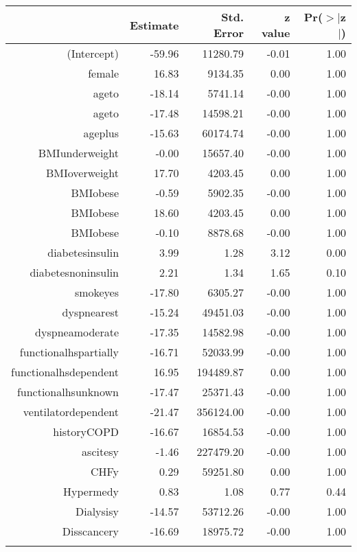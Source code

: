 \bigskip\bigskip
\centering
\begin{tabular}{rrrrr}
  \hline
 & Estimate & Std. Error & z value & Pr($>$$|$z$|$) \\ 
  \hline
(Intercept) & -59.96 & 11280.79 & -0.01 & 1.00 \\ 
  female & 16.83 & 9134.35 & 0.00 & 1.00 \\ 
  age\-65\-to\-74 & -18.14 & 5741.14 & -0.00 & 1.00 \\ 
  age\-75\-to\-84 & -17.48 & 14598.21 & -0.00 & 1.00 \\ 
  age\-85\-plus & -15.63 & 60174.74 & -0.00 & 1.00 \\ 
  BMI\-underweight & -0.00 & 15657.40 & -0.00 & 1.00 \\ 
  BMI\-overweight & 17.70 & 4203.45 & 0.00 & 1.00 \\ 
  BMI\-obese\-1 & -0.59 & 5902.35 & -0.00 & 1.00 \\ 
  BMI\-obese\-2 & 18.60 & 4203.45 & 0.00 & 1.00 \\ 
  BMI\-obese\-3 & -0.10 & 8878.68 & -0.00 & 1.00 \\ 
  diabetes\-insulin & 3.99 & 1.28 & 3.12 & 0.00 \\ 
  diabetes\-noninsulin & 2.21 & 1.34 & 1.65 & 0.10 \\ 
  smoke\-yes & -17.80 & 6305.27 & -0.00 & 1.00 \\ 
  dyspnea\-rest & -15.24 & 49451.03 & -0.00 & 1.00 \\ 
  dyspnea\-moderate & -17.35 & 14582.98 & -0.00 & 1.00 \\ 
  functional\-hs\-partially & -16.71 & 52033.99 & -0.00 & 1.00 \\ 
  functional\-hs\-dependent & 16.95 & 194489.87 & 0.00 & 1.00 \\ 
  functional\-hs\-unknown & -17.47 & 25371.43 & -0.00 & 1.00 \\ 
  ventilator\-dependent & -21.47 & 356124.00 & -0.00 & 1.00 \\ 
  history\-COPD & -16.67 & 16854.53 & -0.00 & 1.00 \\ 
  ascites\-y & -1.46 & 227479.20 & -0.00 & 1.00 \\ 
  CHF\-y & 0.29 & 59251.80 & 0.00 & 1.00 \\ 
  Hyper\-med\-y & 0.83 & 1.08 & 0.77 & 0.44 \\ 
  Dialysis\-y & -14.57 & 53712.26 & -0.00 & 1.00 \\ 
  Diss\-cancer\-y & -16.69 & 18975.72 & -0.00 & 1.00 \\ 
$$
\end{tabular}
